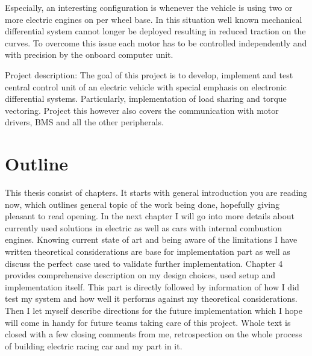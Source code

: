 Especially, an interesting configuration is whenever the vehicle is using two or more electric engines on per wheel base. In this situation well known mechanical differential system cannot longer be deployed resulting in reduced traction on the curves. To overcome this issue each motor has to be controlled independently and with precision by the onboard computer unit.

Project description: 	
The goal of this project is to develop, implement and test central control unit of an electric vehicle with special emphasis on electronic differential systems. Particularly, implementation of load sharing and torque vectoring. Project this however also covers the communication with motor drivers, BMS and all the other peripherals.






\section{Outline}
This thesis consist of  chapters. It starts with general introduction you are reading now, which outlines general topic of the work being done, hopefully giving pleasant to read opening. 
In the next chapter I will go into more details about currently used solutions in electric as well as cars with internal combustion engines. Knowing current state of art and being aware of the limitations I have written theoretical considerations are base for implementation part as well as discuss the perfect case used to validate further implementation.
Chapter 4 provides comprehensive description on my design choices, used setup and implementation itself. This part is directly followed by information of how I did test my system and how well it performs against my theoretical considerations.
Then I let myself describe directions for the future implementation which I hope will come in handy for future teams taking care of this project.
Whole text is closed with a few closing comments from me, retrospection on the whole process of building electric racing car and my part in it.


